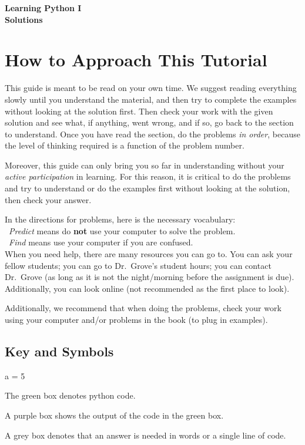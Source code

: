 \documentclass{article}
\begin{document}
\begin{center}
{\LARGE\textbf{Learning Python I}}\\[.25 cm]
{\LARGE\textbf{Solutions}}
\end{center}
\vspace{0.5 cm}
\section{How to Approach This Tutorial}
This guide is meant to be read on your own time. We suggest reading everything slowly until you understand the material, and then try to complete the examples without looking at the solution first. Then check your work with the given solution and see what, if anything, went wrong, and if so, go back to the section to understand. Once you have read the section, do the problems \textit{in order}, because the level of thinking required is a function of the problem number. 

Moreover, this guide can only bring you so far in understanding without your \textit{active participation} in learning. For this reason, it is critical to do the problems and try to understand or do the examples first without looking at the solution, then check your answer.

In the directions for problems, here is the necessary vocabulary:\\
\indent \ \textit{Predict} means do \textbf{not} use your computer to solve the problem.\\
\indent \ \textit{Find} means use your computer if you are confused.\\
When you need help, there are many resources you can go to. You can ask your fellow students; you can go to Dr.~Grove's student hours; you can contact Dr.~Grove (as long as it is not the night/morning before the assignment is due). Additionally, you can look online (not recommended as the first place to look).

Additionally, we recommend that when doing the problems, check your work using your computer and/or problems in the book (to plug in examples).
\subsection{Key and Symbols}
\begin{multicols}{2}
\begin{tcolorbox}[width=.5\textwidth]
	\ttfamily
	a = 5
\end{tcolorbox}
\noindent The green box denotes python code.
\end{multicols}
\begin{multicols}{2}
\begin{tcolorbox}[colback=output, width=.5\textwidth]
	\ttfamily
\end{tcolorbox}
\noindent A purple box shows the output of the code in the green box.
\begin{tcolorbox}[colback=writing, width=.5\textwidth]
	\ttfamily
\end{tcolorbox}
\noindent A grey box denotes that an answer is needed in words or a single line of code.
\end{multicols}
\end{document}
